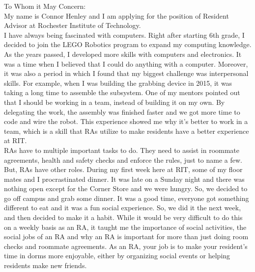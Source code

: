 \documentclass[line,margin]{res}
\begin{document}
\setlength\columnsep{-30pt}
\email{} %
\phone{} %
\address{} %
\address{} %
\website{} %
 
\begin{resume}
 \setlength
 \multicolsep{2pt}
 \begin{adjustwidth}{-92pt}{0pt}
\vspace{10pt}
To Whom it May Concern:\\

My name is Connor Henley and I am applying for the position of Resident Advisor at Rochester Institute of Technology.\\

\hspace{20pt}I have always being fascinated with computers. Right after starting 6th grade, I decided to join the LEGO Robotics program to expand my computing knowledge. As the years passed, I developed more skills with computers and electronics. It was a time when I believed that I could do anything with a computer. Moreover, it was also a period in which I found that my biggest challenge was interpersonal skills. For example, when I was building the grabbing device in 2015, it was taking a long time to assemble the subsystem. One of my mentors pointed out that I should be working in a team, instead of building it on my own. By delegating the work, the assembly was finished faster and we got more time to code and wire the robot. This experience showed me why it’s better to work in a team, which is a skill that RAs utilize to make residents have a better experience at RIT. \\

\hspace{20pt}RAs have to multiple important tasks to do. They need to assist in roommate agreements, health and safety checks and enforce the rules, just to name a few. But, RAs have other roles. During my first week here at RIT, some of my floor mates and I procrastinated dinner. It was late on a Sunday night and there was nothing open except for the Corner Store and we were hungry. So, we decided to go off campus and grab some dinner. It was a good time, everyone got something different to eat and it was a fun social experience. So, we did it the next week, and then decided to make it a habit. While it would be very difficult to do this on a weekly basis as an RA, it taught me the importance of social activities, the social jobs of an RA and why an RA is important for more than just doing room checks and roommate agreements. As an RA, your job is to make your resident’s time in dorms more enjoyable, either by organizing social events or helping residents make new friends.\\


\end{adjustwidth}
\end{resume}
\end{document}
